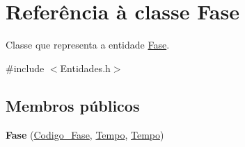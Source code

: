 \hypertarget{class_fase}{
\section{\-Referência à classe \-Fase}
\label{class_fase}
}


\-Classe que representa a entidade \hyperlink{class_fase}{\-Fase}.  




{\ttfamily \#include $<$\-Entidades.\-h$>$}

\subsection*{\-Membros públicos}
\begin{DoxyCompactItemize}
\item 
\hypertarget{class_fase_a01205110dcfe61f938e5cbbda81f458f}{
{\bfseries \-Fase} (\hyperlink{class_codigo___fase}{\-Codigo\-\_\-\-Fase}, \hyperlink{class_tempo}{\-Tempo}, \hyperlink{class_tempo}{\-Tempo})}
\label{class_fase_a01205110dcfe61f938e5cbbda81f458f}


\end{DoxyCompactItemize}
